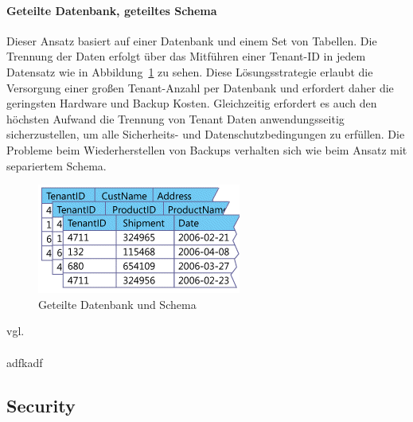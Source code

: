 \paragraph{Geteilte Datenbank, geteiltes Schema} 
Dieser Ansatz basiert auf einer Datenbank und einem Set von Tabellen. Die Trennung der Daten erfolgt über das Mitführen einer Tenant-ID in jedem Datensatz wie in Abbildung~\ref{fig:geteilteDatenbankundSchema} zu sehen. Diese Lösungsstrategie erlaubt die Versorgung einer großen Tenant-Anzahl per Datenbank und erfordert daher die geringsten Hardware und Backup Kosten. Gleichzeitig erfordert es auch den höchsten Aufwand die Trennung von Tenant Daten anwendungsseitig sicherzustellen, um alle Sicherheits- und Datenschutzbedingungen zu erfüllen. Die Probleme beim Wiederherstellen von Backups verhalten sich wie beim Ansatz mit separiertem Schema. 
\begin{figure}[h]
	\centering
	\includegraphics[width=0.5\linewidth]{images/geteilte_datenbank-geteiltes_schema}
	\caption{Geteilte Datenbank und Schema}
	\label{fig:geteilteDatenbankundSchema}
\end{figure}
vgl.
\\
\\
adfkadf 
\subsection{Security}
